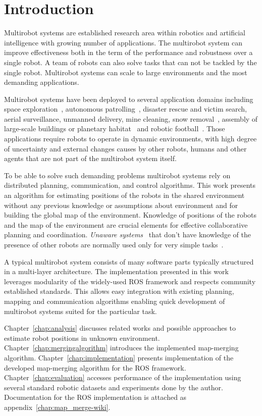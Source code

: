 \chapter*{Introduction}

Multirobot systems are established research area within robotics and artificial intelligence with growing number of applications. The multirobot system can improve effectiveness both in the term of the performance and robustness over a single robot. A team of robots can also solve tasks that can not be tackled by the single robot. Multirobot systems can scale to large environments and the most demanding applications.

Multirobot systems have been deployed to several application domains including space exploration~\citep{goldberg2002distributedspace,huntsberger2003campout}, autonomous patrolling~\citep{parker2003parolling100}, disaster rescue and victim search, aerial surveillance, unmanned delivery, mine cleaning, snow removal~\citep{choset2001coverage}, assembly of large-scale buildings or planetary habitat~\citep{goldberg2002distributedspace} and robotic football~\citep{asada1999robocup}. Those applications require robots to operate in  dynamic environments, with high degree of uncertainty and external changes causes by other robots, humans and other agents that are not part of the multirobot system itself.

To be able to solve such demanding problems multirobot systems rely on distributed planning, communication, and control algorithms. This work presents an algorithm for estimating positions of the robots in the shared environment without any previous knowledge or assumptions about environment and for building the global map of the environment. Knowledge of positions of the robots and the map of the environment are crucial elements for effective collaborative planning and coordination. \textit{Unaware systems}~\cite{farinelli2004multirobot} that don't have knowledge of the presence of other robots are normally used only for very
simple tasks~\cite{farinelli2004multirobot}.

A typical multirobot system consists of many software parts typically structured in a multi-layer architecture. The implementation presented in this work leverages modularity of the widely-used \gls{ROS} framework and respects community established standards. This allows easy integration with existing planning, mapping and communication algorithms enabling quick development of multirobot systems suited for the particular task.

Chapter~\ref{chap:analysis} discusses related works and possible approaches to estimate robot positions in unknown environment. Chapter~\ref{chap:mergingalgorithm} introduces the implemented map-merging algorithm. Chapter~\ref{chap:implementation} presents implementation of the developed map-merging algorithm for the \gls{ROS} framework. Chapter~\ref{chap:evaluation} accesses performance of the implementation using several standard robotic datasets and experiments done by the author. Documentation for the \gls{ROS} implementation is attached as appendix~\ref{chap:map_merge-wiki}.
